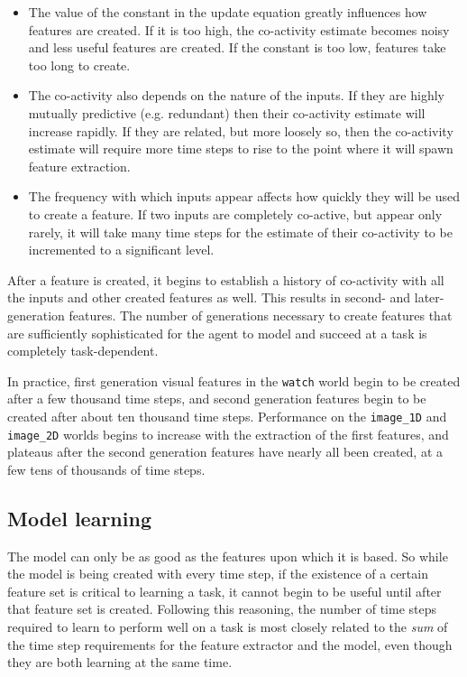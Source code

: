 \begin{itemize}
\item The value of the constant in the update equation greatly influences how features are created. If it is too high, the co-activity estimate becomes noisy and less useful features are created. If the constant is too low, features take too long to create. 

\item The co-activity also depends on the nature of the inputs. If they are highly mutually predictive (e.g. redundant) then their co-activity estimate will increase rapidly. If they are related, but more loosely so, then the co-activity estimate will require more time steps to rise to the point where it will spawn feature extraction. 

\item The frequency with which inputs appear affects how quickly they will be used to create a feature. If two inputs are completely co-active, but appear only rarely, it will take many time steps for the estimate of their co-activity to be incremented to a significant level.

\end{itemize}

After a feature is created, it begins to establish a history of co-activity with all the inputs and other created features as well. This results in second- and later-generation features. The number of generations necessary to create features that are sufficiently sophisticated for the agent to model and succeed at a task is completely task-dependent.

In practice, first generation visual features in the \texttt{watch} world begin to be created after a few thousand time steps, and second generation features begin to be created after about ten thousand time steps. Performance on the \texttt{image\_1D} and  \texttt{image\_2D} worlds begins to increase with the extraction of the first features, and plateaus after the second generation features have nearly all been created, at a few tens of thousands of time steps. 

\subsection{Model learning}

The model can only be as good as the features upon which it is based. So while the model is being created with every time step, if the existence of a certain feature set is critical to learning a task, it cannot begin to be useful until after that feature set is created. Following this reasoning, the number of time steps required to learn to perform well on a task is most closely related to the {\em sum} of the time step requirements for the feature extractor and the model, even though they are both learning at the same time.

